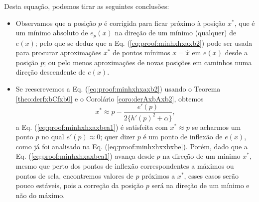 \begin{myproofT}
Desta equação, podemos tirar as seguintes conclusões:


\begin{itemize}

\item Observamos que a posição $p$ é corrigida para ficar próximo à posição $x^*$, 
que é um mínimo absoluto de $e_p(x)$ na direção de um mínimo (qualquer) de $e(x)$;
pelo que se deduz que a Eq. (\ref{eq:proof:minhxhxaxb2})
pode ser usada para procurar aproximações $x^*$ de pontos mínimos $x=\hat{x}$ em $e(x)$ desde a posição $p$;
ou pelo menos aproximações de novas posições em caminhos numa direção descendente de $e(x)$.

\item Se reescrevemos a Eq. (\ref{eq:proof:minhxhxaxb2}) usando o Teorema \ref{theo:derfxbCfxb0}
e o Corolário \ref{coro:derAxbAxb2},
obtemos
\begin{equation}\label{eq:proof:minhxhxaxbea1}
x^* \approx p -
\frac{ e'(p)}{2 \{h'(p)^2+\alpha\} },
\end{equation}
a Eq. (\ref{eq:proof:minhxhxaxbea1}) é satisfeita 
com $x^* \approx p$
se acharmos um  ponto $p$ no qual  
$e'(p)\approx 0$; 
quer dizer $p$ é um ponto de inflexão de $e(x)$, como já foi analisado na Eq. (\ref{eq:proof:minhxhxxbxbe}).
Porém, dado que a Eq. (\ref{eq:proof:minhxhxaxbea1}) avança desde $p$ na direção de um mínimo $x^*$, 
mesmo que perto dos pontos de inflexão correspondentes a máximos ou pontos de sela,
encontremos valores de $p$ próximos a $x^*$,
 esses casos serão pouco estáveis, pois
a correção da posição $p$ será na direção de um mínimo e não do máximo.


\end{itemize}
\end{myproofT}
